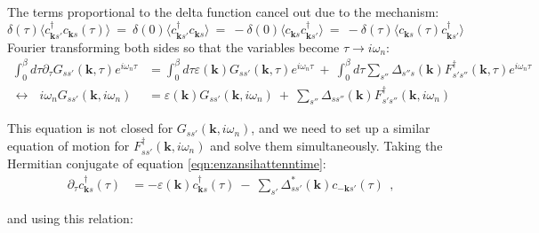 \documentclass[a4j]{jsarticle}
\begin{document}
The terms proportional to the delta function cancel out due to the mechanism:
$$
	\delta ( \tau )
	\langle c_{\bm{k} s'}^{\dagger} c_{\bm{k}s}(\tau) \rangle
	\ = \
	\delta ( 0 )
	\langle c_{\bm{k} s'}^{\dagger} c_{\bm{k}s} \rangle
	\ = \
	-
	\delta ( 0 )
	\langle c_{\bm{k}s} c_{\bm{k} s'}^{\dagger} \rangle
	\ = \
	-
	\delta ( \tau )
	\langle c_{\bm{k}s}(\tau) c_{\bm{k} s'}^{\dagger} \rangle
$$
Fourier transforming both sides so that the variables become $\tau \to i \omega_{n}$:
\begin{align}
	\int^{\beta}_{0} d \tau
	\partial_{\tau}
	G_{ss'}(\bm{k} , \tau)
	e^{i \omega_{n} \tau}
	&=
	\int^{\beta}_{0} d \tau
	\varepsilon( \bm{k} )
	G_{ss'}(\bm{k} , \tau)
	e^{i \omega_{n} \tau}
	\ + \
	\int^{\beta}_{0} d \tau
	\sum_{s''}
	\Delta_{ s'' s }( \bm{k} )
	F_{ s' s'' }^{\dagger} ( \bm{k} , \tau)
	e^{i \omega_{n} \tau}
	\nonumber \\[2mm]
	\longleftrightarrow \ \ \
	i \omega_{n}
	G_{ss'}(\bm{k} , i \omega_{n} )
	&=
	\varepsilon( \bm{k} )
	G_{ss'}(\bm{k} , i \omega_{n} )
	\ + \
	\sum_{s''}
	\Delta_{ s s'' }( \bm{k} )
	F_{ s' s'' }^{\dagger} ( \bm{k} , i \omega_{n} )
\end{align}

This equation is not closed for $G_{ss'}(\bm{k} , i \omega_{n} )$, and we need to set up a similar equation of motion for $F_{ss'}^{\dagger}(\bm{k} , i \omega_{n} )$ and solve them simultaneously.
Taking the Hermitian conjugate of equation \ref{eqn:enzansihattenntime}:
\begin{align}
	\partial_{\tau}
	c_{\bm{k}s}^{\dagger} (\tau)
	&=
	-
	\varepsilon( \bm{k} )
	c_{\bm{k} s}^{\dagger} (\tau)
	\ - \
	\sum_{ s' }
	\Delta_{ s s' }^{*} ( \bm{k} )
	c_{ - \bm{k} s'} ( \tau )
	\ \ ,
\end{align}

and using this relation:
\end{document}
